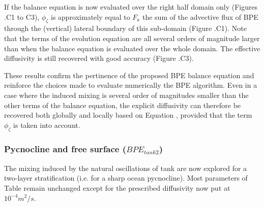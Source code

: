 If the balance equation is now evaluated over the right half domain only (Figures .C1 to C3), $\phi_{\zeta}$ is approximately equal to $F_a$ the sum of the advective flux of BPE through the (vertical) lateral boundary of this sub-domain (Figure .C1). Note that the terms of the evolution equation are all several orders of magnitude larger than when the balance equation is evaluated over the whole domain. The effective diffusivity is still recovered with good accuracy (Figure .C3).

These results confirm the pertinence of the proposed BPE balance equation  and reinforce the choices made to evaluate numerically the BPE algorithm. Even in a case where the induced mixing is several order of magnitudes smaller than the other terms of the balance equation, the explicit diffusivity can therefore be recovered both globally and locally based on Equation , provided that the term $\phi_{\zeta}$ is taken into account.

\subsubsection{Pycnocline and free surface ({$BPE_{tank2}$})}
The mixing induced by the natural oscillations of tank are now explored for a two-layer stratification (i.e. for a sharp ocean pycnocline). Most parameters of Table  remain unchanged except for the prescribed diffusivity now put at $10^{-4}m^2/s$.

